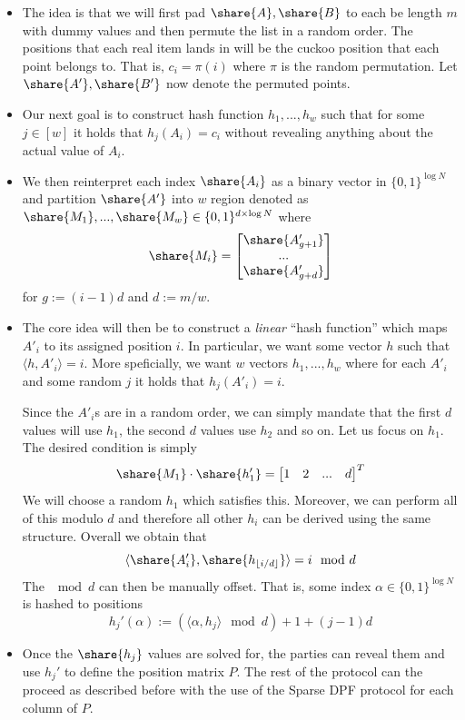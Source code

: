 \begin{itemize}
    \item The idea is that we will first pad $\share{A},\share{B}$ to each be length $m$ with dummy values and then permute the list in a random order. The positions that each real item lands in will be the cuckoo position that each point belongs to. That is, $c_i=\pi(i)$ where $\pi$ is the random permutation. Let $\share{A'},\share{B'}$ now denote the permuted points.

    \item Our next goal is to construct hash function $h_1,...,h_w$ such that for some $j\in [w]$ it holds that $h_j(A_i)=c_i$ without revealing anything about the actual value of $A_i$.

    \item We then reinterpret each index $\share{A_i}$ as a binary vector in $\{0,1\}^{\log N}$ and partition $\share{A'}$ into $w$ region denoted as $\share{M_1},...,\share{M_w}\in \{0,1\}^{d\times \log N}$ where 
    $$
        \share{M_i}=\begin{bmatrix}
        \share{A'_{g+1}}\\
        ...\\
        \share{A'_{g+d}}
    \end{bmatrix}
    $$
    for $g:=(i-1)d$ and $d:=m/w$.

    \item The core idea will then be to construct a \emph{linear} ``hash function'' which maps $A'_i$ to its assigned position $i$. In particular, we want some vector $h$ such that $\langle h, A'_i\rangle =i$. More speficially, we want $w$ vectors $h_1,...,h_w$ where  for each $A'_i$ and some random $j$ it holds that $h_j(A'_i)=i$. 
    
    Since the $A'_i$s are in a random order, we can simply mandate that the first $d$ values will use $h_1$, the second $d$ values use $h_2$ and so on. Let us focus on $h_1$. The desired condition is simply
    $$
        \share{M_1}\cdot \share{h_1'}=\begin{bmatrix}
            1&
            2&
            ...&
            d           
        \end{bmatrix}^T
    $$
    We will choose a random $h_1$ which satisfies this. Moreover, we can perform all of this modulo $d$ and therefore all other $h_i$ can be derived using the same structure. Overall we obtain that
    $$
        \langle \share{A_i'}, \share{h_{\lfloor i/d\rfloor}}  \rangle= i \mod d  
    $$
    The $\mod d$ can then be manually offset. That is, some index $\alpha \in \{0,1\}^{\log N}$ is hashed to positions
    $$
        h_j'(\alpha) := (\langle \alpha, h_j \rangle \mod d) + 1 + (j-1)d
    $$

    \item Once the $\share{h_j}$ values are solved for, the parties can reveal them and use $h_j'$ to define the position matrix $P$. The rest of the protocol can the proceed as described before with the use of the Sparse DPF protocol for each column of $P$.
\end{itemize}

